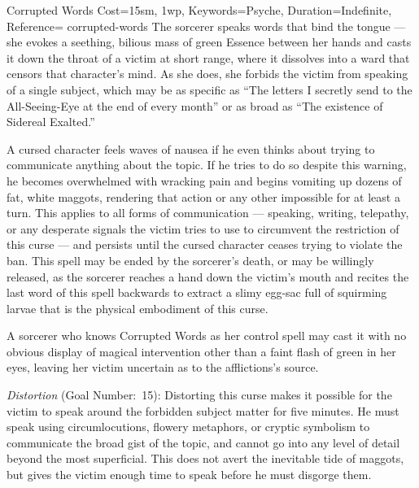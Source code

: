 \begin{Spell}{Corrupted Words}{%
    Cost={15sm, 1wp},
    Keywords=Psyche,
    Duration=Indefinite,
    Reference=\cite*[p.~472]{ex3}
}{corrupted-words}
    The sorcerer speaks words that bind the tongue --- she evokes a seething,
    bilious mass of green Essence between her hands and casts it down the
    throat of a victim at short range, where it dissolves into a ward that
    censors that character's mind. As she does, she forbids the victim from
    speaking of a single subject, which may be as specific as ``The letters I
    secretly send to the All-Seeing-Eye at the end of every month'' or as broad
    as ``The existence of Sidereal Exalted.'' 

    A cursed character feels waves of nausea if he even thinks about trying to
    communicate anything about the topic. If he tries to do so despite this
    warning, he becomes overwhelmed with wracking pain and begins vomiting up
    dozens of fat, white maggots, rendering that action or any other impossible
    for at least a turn. This applies to all forms of communication ---
    speaking, writing, telepathy, or any desperate signals the victim tries to
    use to circumvent the restriction of this curse --- and persists until the
    cursed character ceases trying to violate the ban. This spell may be ended
    by the sorcerer's death, or may be willingly released, as the sorcerer
    reaches a hand down the victim's mouth and recites the last word of this
    spell backwards to extract a slimy egg-sac full of squirming larvae that is
    the physical embodiment of this curse.

    \begin{Unavailable}
        A sorcerer who knows Corrupted Words as her control spell may cast it
        with no obvious display of magical intervention other than a faint
        flash of green in her eyes, leaving her victim uncertain as to the
        afflictions's source.
    \end{Unavailable}

    \textit{Distortion} (Goal Number:~15): Distorting this curse makes it
    possible for the victim to speak around the forbidden subject matter for
    five minutes. He must speak using circumlocutions, flowery metaphors, or
    cryptic symbolism to communicate the broad gist of the topic, and cannot go
    into any level of detail beyond the most superficial. This does not avert
    the inevitable tide of maggots, but gives the victim enough time to speak
    before he must disgorge them.
\end{Spell}


